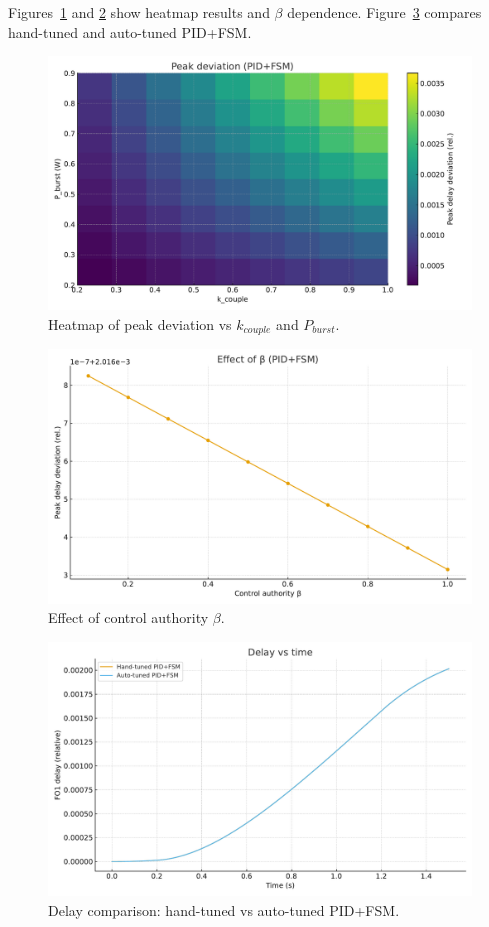 \documentclass[conference]{IEEEtran}
\begin{document}
Figures~\ref{fig:heatmap} and \ref{fig:beta} show heatmap results
and $\beta$ dependence. Figure~\ref{fig:delay} compares hand-tuned and auto-tuned PID+FSM.

\begin{figure}[h]
\centering
\includegraphics[width=0.9\columnwidth]{figs/heatmap.pdf}
\caption{Heatmap of peak deviation vs $k_{couple}$ and $P_{burst}$.}
\label{fig:heatmap}
\end{figure}

\begin{figure}[h]
\centering
\includegraphics[width=0.9\columnwidth]{figs/beta_curve.pdf}
\caption{Effect of control authority $\beta$.}
\label{fig:beta}
\end{figure}

\begin{figure}[h]
\centering
\includegraphics[width=0.9\columnwidth]{figs/delay_compare.pdf}
\caption{Delay comparison: hand-tuned vs auto-tuned PID+FSM.}
\label{fig:delay}
\end{figure}
\end{document}
